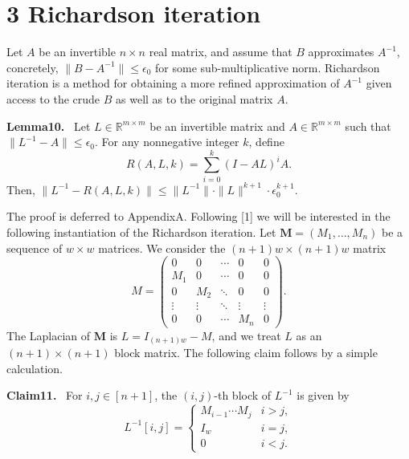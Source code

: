 \documentclass[10pt,a4paper]{article}
\newenvironment{authorclaim}[1]{\par\medskip\noindent\textbf{#1.}\ }{\par\medskip}
\begin{document}
\section*{3 Richardson iteration}
Let $A$ be an invertible $n\times n$ real matrix, and assume that $B$ approximates $A^{-1}$, concretely, $\|B-A^{-1}\|\le\epsilon_0$ for some sub-multiplicative norm. Richardson iteration is a method for obtaining a more refined approximation of $A^{-1}$ given access to the crude $B$ as well as to the original matrix $A$.
\begin{authorclaim}{Lemma10}
Let $L\in\mathbb R^{m\times m}$ be an invertible matrix and $A\in\mathbb R^{m\times m}$ such that $\|L^{-1}-A\|\le\epsilon_0$. For any nonnegative integer $k$, define
\[R(A,L,k)=\sum_{i=0}^k(I-AL)^iA.\]
Then, $\|L^{-1}-R(A,L,k)\|\le\|L^{-1}\|\cdot\|L\|^{k+1}\cdot\epsilon_0^{k+1}$.
\end{authorclaim}
The proof is deferred to AppendixA.
Following [1] we will be interested in the following instantiation of the Richardson iteration. Let $\mathbf M=(M_1,\ldots,M_n)$ be a sequence of $w\times w$ matrices. We consider the $(n+1)w\times(n+1)w$ matrix
\begin{equation}\tag{4}M=\begin{pmatrix}0&0&\cdots&0&0\\M_1&0&\cdots&0&0\\0&M_2&\ddots&0&0\\\vdots&\vdots&\ddots&\vdots&\vdots\\0&0&\cdots&M_n&0\end{pmatrix}.\end{equation}
The Laplacian of $\mathbf M$ is $L=I_{(n+1)w}-M$, and we treat $L$ as an $(n+1)\times(n+1)$ block matrix. The following claim follows by a simple calculation.
\begin{authorclaim}{Claim11}
For $i,j\in[n+1]$, the $(i,j)$-th block of $L^{-1}$ is given by
\[L^{-1}[i,j]=\begin{cases}M_{i-1}\cdots M_j&i>j,\\I_w&i=j,\\0&i<j.\end{cases}\]
\end{authorclaim}
\end{document}
